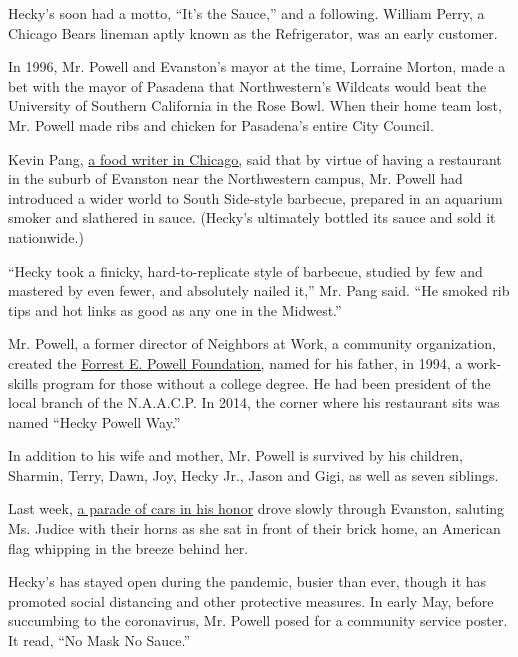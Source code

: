 Hecky's soon had a motto, ``It's the Sauce,'' and a following. William
Perry, a Chicago Bears lineman aptly known as the Refrigerator, was an
early customer.

In 1996, Mr. Powell and Evanston's mayor at the time, Lorraine Morton,
made a bet with the mayor of Pasadena that Northwestern's Wildcats would
beat the University of Southern California in the Rose Bowl. When their
home team lost, Mr. Powell made ribs and chicken for Pasadena's entire
City Council.

Kevin Pang, \href{https://www.saveur.com/chicago-barbecue/}{a food
writer in Chicago,} said that by virtue of having a restaurant in the
suburb of Evanston near the Northwestern campus, Mr. Powell had
introduced a wider world to South Side-style barbecue, prepared in an
aquarium smoker and slathered in sauce. (Hecky's ultimately bottled its
sauce and sold it nationwide.)

``Hecky took a finicky, hard-to-replicate style of barbecue, studied by
few and mastered by even fewer, and absolutely nailed it,'' Mr. Pang
said. ``He smoked rib tips and hot links as good as any one in the
Midwest.''

Mr. Powell, a former director of Neighbors at Work, a community
organization, created the \href{http://forrestepowell.com/}{Forrest E.
Powell Foundation,} named for his father, in 1994, a work-skills program
for those without a college degree. He had been president of the local
branch of the N.A.A.C.P. In 2014, the corner where his restaurant sits
was named ``Hecky Powell Way.''

In addition to his wife and mother, Mr. Powell is survived by his
children, Sharmin, Terry, Dawn, Joy, Hecky Jr., Jason and Gigi, as well
as seven siblings.

Last week, \href{https://www.youtube.com/watch?v=8MYiswrtAdk}{a parade
of cars in his honor} drove slowly through Evanston, saluting Ms. Judice
with their horns as she sat in front of their brick home, an American
flag whipping in the breeze behind her.

Hecky's has stayed open during the pandemic, busier than ever, though it
has promoted social distancing and other protective measures. In early
May, before succumbing to the coronavirus, Mr. Powell posed for a
community service poster. It read, ``No Mask No Sauce.''

\href{https://www.nytimes3xbfgragh.onion/interactive/2020/obituaries/people-died-coronavirus-obituaries.html?action=click\&pgtype=Article\&state=default\&region=BELOW_MAIN_CONTENT\&context=covid_obits_promo}{}


